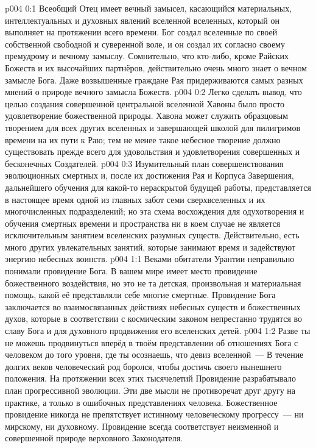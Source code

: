 \author{Божественный Советник}
\vs p004 0:1 Всеобщий Отец имеет вечный замысел, касающийся материальных, интеллектуальных и духовных явлений вселенной вселенных, который он выполняет на протяжении всего времени. Бог создал вселенные по своей собственной свободной и суверенной воле, и он создал их согласно своему премудрому и вечному замыслу. Сомнительно, что кто\hyp{}либо, кроме Райских Божеств и их высочайших партнёров, действительно очень много знает о вечном замысле Бога. Даже возвышенные граждане Рая придерживаются самых разных мнений о природе вечного замысла Божеств.
\vs p004 0:2 Легко сделать вывод, что целью создания совершенной центральной вселенной Хавоны было просто удовлетворение божественной природы. Хавона может служить образцовым творением для всех других вселенных и завершающей школой для пилигримов времени на их пути к Раю; тем не менее такое небесное творение должно существовать прежде всего для удовольствия и удовлетворения совершенных и бесконечных Создателей.
\vs p004 0:3 Изумительный план совершенствования эволюционных смертных и, после их достижения Рая и Корпуса Завершения, дальнейшего обучения для какой\hyp{}то нераскрытой будущей работы, представляется в настоящее время одной из главных забот семи сверхвселенных и их многочисленных подразделений; но эта схема восхождения для одухотворения и обучения смертных времени и пространства ни в коем случае не является исключительным занятием вселенских разумных существ. Действительно, есть много других увлекательных занятий, которые занимают время и задействуют энергию небесных воинств.
\vs p004 1:1 Веками обитатели Урантии неправильно понимали провидение Бога. В вашем мире имеет место провидение божественного воздействия, но это не та детская, произвольная и материальная помощь, какой её представляли себе многие смертные. Провидение Бога заключается во взаимосвязанных действиях небесных существ и божественных духов, которые в соответствии с космическим законом непрестанно трудятся во славу Бога и для духовного продвижения его вселенских детей.
\vs p004 1:2 Разве ты не можешь продвинуться вперёд в твоём представлении об отношениях Бога с человеком до того уровня, где ты осознаешь, что девиз вселенной~---  В течение долгих веков человеческий род боролся, чтобы достичь своего нынешнего положения. На протяжении всех этих тысячелетий Провидение разрабатывало план прогрессивной эволюции. Эти две мысли не противоречат друг другу на практике, а только в ошибочных представлениях человека. Божественное провидение никогда не препятствует истинному человеческому прогрессу~--- ни мирскому, ни духовному. Провидение всегда соответствует неизменной и совершенной природе верховного Законодателя.
